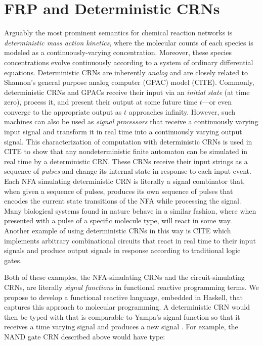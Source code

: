 
\section{FRP and Deterministic CRNs}
\label{sec:frp_dcrns}

Arguably the most prominent semantics for chemical reaction networks is \emph{deterministic mass action kinetics}, where the molecular counts of each species is modeled as a continuously-varying concentration.
Moreover, these species concentrations evolve continuously according to a system of ordinary differential equations.
Deterministic CRNs are inherently \emph{analog} and are closely related to Shannon's general purpose analog computer (GPAC) model (CITE).
Commonly, deterministic CRNs and GPACs receive their input via an \emph{initial state} (at time zero), process it, and present their output at some future time \( t \)---or even converge to the appropriate output as \( t \) approaches infinity.
However, such machines can also be used as \emph{signal processors} that receive a continuously varying input signal and transform it in real time into a continuously varying output signal.
This characterization of computation with deterministic CRNs is used in CITE  to show that any nondeterministic finite automaton can be simulated in real time by a deterministic CRN.
These CRNs receive their input strings as a sequence of \emph{pulses} and change its internal state in response to each input event.
Each NFA simulating deterministic CRN is literally a signal combinator that, when given a sequence of pulses, produces its own sequence of pulses that encodes the current state transitions of the NFA while processing the signal.
Many biological systems found in nature behave in a similar fashion, where when presented with a pulse of a specific molecule type, will react in some way.
Another example of using deterministic CRNs in this way is CITE  which implements arbitrary combinational circuits that react in real time to their input signals and produce output signals in response according to traditional logic gates.

Both of these examples, the NFA-simulating CRNs and the circuit-simulating CRNs, are literally \emph{signal functions} in functional reactive programming terms.
We propose to develop a functional reactive language, embedded in Haskell, that captures this approach to molecular programming.
A deterministic CRN would then be typed with  that is comparable to Yampa's signal function  so that it receives a time varying signal  and produces a new signal .
For example, the NAND gate CRN described above would have type:

